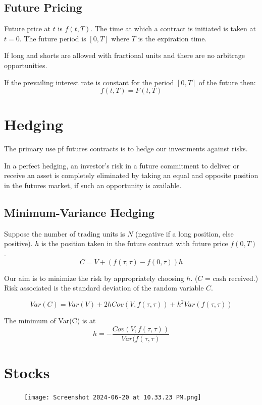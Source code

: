\documentclass{report}
\begin{document}
\subsection{Future Pricing}
Future price at $t$ is $f(t, T)$. The time at which a contract is initiated is taken at $t = 0$. The future period is $[0, T]$ where $T$ is the expiration time.


If long and shorts are allowed with fractional units and there are no arbitrage opportunities.


If the prevailing interest rate is constant for the period $[0, T]$ of the future then:
\[f(t, T) = F(t, T)\]

\section{Hedging}
The primary use pf futures contracts is to hedge our investments against risks.


In a perfect hedging, an investor's risk in a future commitment to deliver or receive an asset is completely eliminated by taking an equal and opposite position in the futures market, if such an opportunity is available.


\subsection{Minimum-Variance Hedging}
Suppose the number of trading units is $N$ (negative if a long position, else positive).
$h$ is the position taken in the future contract with future price $f(0, T)$. 
\[C = V + (f(\tau, \tau) - f(0, \tau))h\]

Our aim is to minimize the risk by appropriately choosing $h$. ($C$ = cash received.)
Risk associated is the standard deviation of the random variable $C$.


\begin{equation}
    Var(C) = Var(V) + 2hCov(V, f(\tau, \tau)) + h^2Var(f(\tau, \tau))
\end{equation}

The minimum of Var(C) is at
\[
h = -\frac{Cov(V, f(\tau, \tau))}{Var(f(\tau, \tau)}
\]


\section{Stocks}
\begin{figure}[h!]
     \centering
     \texttt{[image: Screenshot 2024-06-20 at 10.33.23 PM.png]}
     \label{fig:csb}
\end{figure}
\end{document}
